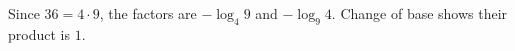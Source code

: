 Since $36=4\cdot9$, the factors are $-\log_4 9$ and $-\log_9 4$. Change of base shows their product is $\boxed1$.
